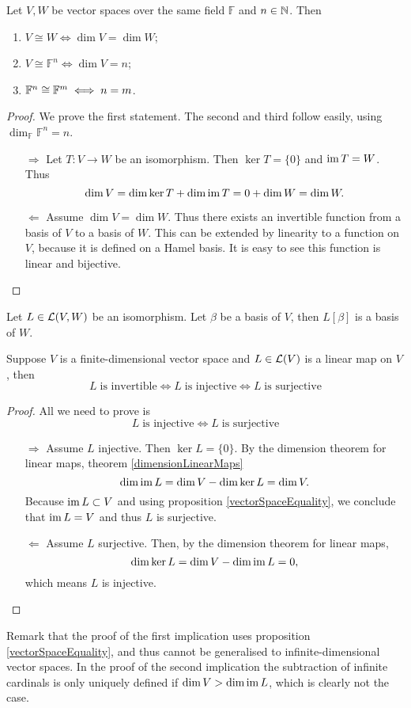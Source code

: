 \begin{proposition} \label{isomorphicDimension}
Let $V,W$ be vector spaces over the same field $\mathbb{F}$ and $n\in \mathbb{N}$. Then
\begin{enumerate}
\item $V\cong W \iff \dim V = \dim W$;
\item $V \cong \mathbb{F}^n \iff \dim V = n$;
\item $\mathbb{F}^n \cong \mathbb{F}^m \iff n=m$.
\end{enumerate}
\label{isomorphicCondition}
\end{proposition}
\begin{proof}
We prove the first statement. The second and third follow easily, using $\dim_\mathbb{F} \mathbb{F}^n = n$.
\begin{itemize}
\item[$\boxed{\Rightarrow}$] Let $T:V\to W$ be an isomorphism. Then $\ker T = \{0\}$ and $\operatorname{im} T = W$. Thus
\[ \dim V = \dim \ker T + \dim \operatorname{im} T = 0 + \dim W = \dim W. \]
\item[$\boxed{\Leftarrow}$] Assume $\dim V = \dim W$. Thus there exists an invertible function from a basis of $V$ to a basis of $W$. This can be extended by linearity to a function on $V$, because it is defined on a Hamel basis. It is easy to see this function is linear and bijective.
\end{itemize}
\end{proof}

\begin{proposition} \label{mappingOfBasisByIsomorphism}
Let $L\in\operatorname{\mathcal{L}}(V,W)$ be an isomorphism. Let $\beta$ be a basis of $V$, then $L[\beta]$ is a basis of $W$.
\end{proposition}

\begin{proposition} \label{invertibleFiniteDim}
Suppose $V$ is a finite-dimensional vector space and $L\in \operatorname{\mathcal{L}}(V)$ is a linear map on $V$, then
\[ L \;\text{is invertible} \iff L \;\text{is injective} \iff L \;\text{is surjective} \]
\end{proposition}
\begin{proof}
All we need to prove is
\[ L \;\text{is injective} \iff L \;\text{is surjective} \]
\begin{itemize}
\item[$\boxed{\Rightarrow}$] Assume $L$ injective. Then $\ker L = \{0\}$. By the dimension theorem for linear maps, theorem \ref{dimensionLinearMaps}
\[ \dim \operatorname{im} L = \dim V - \dim \ker L = \dim V. \]
Because $\operatorname{im} L \subset V$ and using proposition \ref{vectorSpaceEquality}, we conclude that $\operatorname{im} L = V$ and thus $L$ is surjective.
\item[$\boxed{\Leftarrow}$] Assume $L$ surjective. Then, by the dimension theorem for linear maps,
\[ \dim \ker L = \dim V - \dim \operatorname{im} L = 0, \]
which means $L$ is injective.
\end{itemize}
\end{proof}
Remark that the proof of the first implication uses proposition \ref{vectorSpaceEquality}, and thus cannot be generalised to infinite-dimensional vector spaces. In the proof of the second implication the subtraction of infinite cardinals is only uniquely defined if  $\dim V > \dim \operatorname{im} L$, which is clearly not the case.

